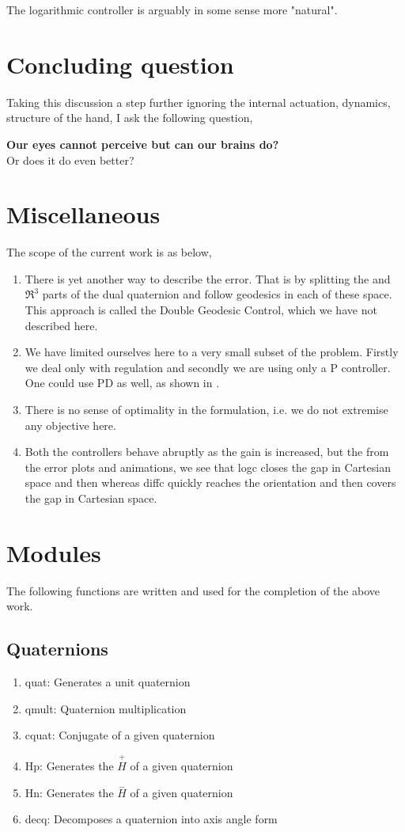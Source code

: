 \documentclass[a4paper,12pt]{article}
\newcommand{\Hp}{\ensuremath{\stackrel{+}{H}}\xspace}
\newcommand{\Hn}{\ensuremath{\stackrel{-}{H}}\xspace}
\begin{document}
The logarithmic controller is arguably in some sense more "natural". 
\section{Concluding question}
Taking this discussion a step further ignoring the internal actuation, dynamics, structure of the hand, I ask the following question,
\begin{center}
	{\bf Our eyes cannot perceive \SE but can our brains do?}\\
	Or does it do even better?
\end{center}
\section{Miscellaneous}
The scope of the current work is as below,
\begin{enumerate}
	\item There is yet another way to describe the error. That is by splitting the \SO and $\Re^3$ parts of the dual quaternion and follow geodesics in each of these space. This approach is called the Double Geodesic Control, which we have not described here.
	\item We have limited ourselves here to a very small subset of the problem. Firstly we deal only with regulation and secondly we are using only a P controller. One could use PD as well, as shown in \cite{bullo1995proportional}.
	\item There is no sense of optimality in the formulation, i.e. we do not extremise any objective here.
	\item Both the controllers behave abruptly as the gain is increased, but the from the error plots and animations, we see that logc closes the gap in Cartesian space and then \SO whereas diffc quickly reaches the orientation and then covers the gap in Cartesian space.
\end{enumerate}


\appendix
\section{Modules}
The following functions are written and used for the completion of the above work.
\subsection{Quaternions}
\begin{enumerate}
	\item quat: Generates a unit quaternion
	\item qmult: Quaternion multiplication
	\item cquat: Conjugate of a given quaternion
	\item Hp: Generates the \Hp of a given quaternion
	\item Hn: Generates the \Hn of a given quaternion
	\item decq: Decomposes a quaternion into axis angle form
\end{enumerate}
\end{document}
